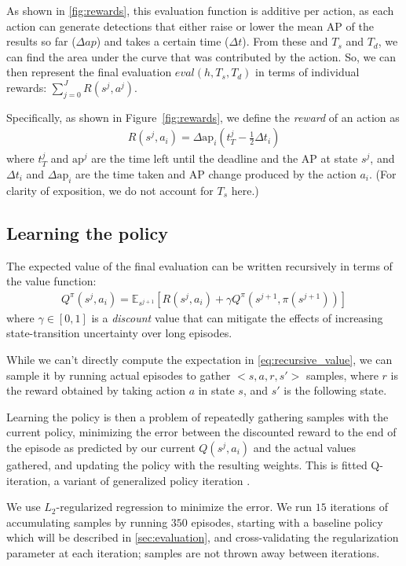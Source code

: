 As shown in \autoref{fig:rewards}, this evaluation function is additive per action, as each action can generate detections that either raise or lower the mean AP of the results so far ($\Delta ap$) and takes a certain time ($\Delta t$).
From these and $T_s$ and $T_d$, we can find the area under the curve that was contributed by the action.
So, we can then represent the final evaluation $eval(h,T_s,T_d)$ in terms of individual rewards: $\sum_{j=0}^J R(s^j,a^j)$.

Specifically, as shown in Figure~\ref{fig:rewards}, we define the \emph{reward} of an action as
\begin{align}\label{eq:advanced}
R(s^j,a_i) = \Delta \text{ap}_i (t_T^j-\frac{1}{2}\Delta t_i)
\end{align}
where $t_T^j$ and $\text{ap}^j$ are the time left until the deadline and the AP at state $s^j$, and $\Delta t_i$ and $\Delta \text{ap}_i$ are the time taken and AP change produced by the action $a_i$.
(For clarity of exposition, we do not account for $T_s$ here.)

\subsection{Learning the policy}
The expected value of the final evaluation can be written recursively in terms of the value function:
\begin{align} \label{eq:recursive_value}
Q^\pi(s^j,a_i) = \mathbb{E}_{s^{j+1}} [R(s^j,a_i) + \gamma Q^\pi(s^{j+1},\pi(s^{j+1}))]
\end{align}
where $\gamma \in [0,1]$ is a \emph{discount} value that can mitigate the effects of increasing state-transition uncertainty over long episodes.

While we can't directly compute the expectation in \eqref{eq:recursive_value}, we can sample it by running actual episodes to gather $<s,a,r,s'>$ samples, where $r$ is the reward obtained by taking action $a$ in state $s$, and $s'$ is the following state.

Learning the policy is then a problem of repeatedly gathering samples with the current policy, minimizing the error between the discounted reward to the end of the episode as predicted by our current $Q(s^j,a_i)$ and the actual values gathered, and updating the policy with the resulting weights.
This is fitted Q-iteration, a variant of generalized policy iteration \cite{Ernst2005,Sutton1998}.

We use $L_2$-regularized regression to minimize the error.
We run $15$ iterations of accumulating samples by running $350$ episodes, starting with a baseline policy which will be described in \autoref{sec:evaluation}, and cross-validating the regularization parameter at each iteration; samples are not thrown away between iterations.

